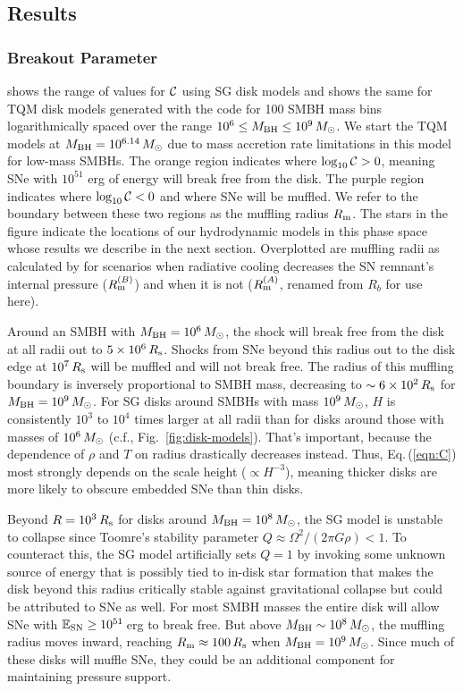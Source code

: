 
\subsection{Results} \label{sec:results-snhydro}

\subsubsection{Breakout Parameter}
 shows the range of values for $\mathcal{C}$ using SG disk models and  shows the same for TQM disk models generated with the  code for 100 SMBH mass bins logarithmically spaced over the range $10^6 \leq M_{\rm BH} \leq 10^9\,M_{\odot}$.
We start the TQM models at $M_{\rm BH}=10^{6.14}\,M_{\odot}$ due to mass accretion rate limitations in this model for low-mass SMBHs.
The orange region indicates where $\log_{10}\mathcal{C}>0$, meaning SNe with $10^{51}$ erg of energy will break free from the disk.
The purple region indicates where $\log_{10}\mathcal{C}<0$ and where SNe will be muffled.
We refer to the boundary between these two regions as the muffling radius $R_{\rm m}$.
The stars in the figure indicate the locations of our hydrodynamic models in this phase space whose results we describe in the next section.
Overplotted are muffling radii as calculated by \citet{Moranchel+21} for scenarios when radiative cooling decreases the SN remnant's internal pressure ($R_{\rm m}^{(B)}$) and when it is not ($R_{\rm m}^{(A)}$, renamed from $R_b$ for use here).

Around an SMBH with $M_{\rm BH}=10^6\,M_{\odot}$, the shock will break free from the disk at all radii out to $5\times10^6\,R_{\rm s}$.
Shocks from SNe beyond this radius out to the disk edge at $10^7\,R_{\rm s}$ will be muffled and will not break free.
The radius of this muffling boundary is inversely proportional to SMBH mass, decreasing to $\sim 6\times10^2\,R_{\rm s}$ for $M_{\rm BH}=10^9\,M_{\odot}$.
For SG disks around SMBHs with mass $10^9\,M_{\odot}$, $H$ is consistently $10^3$ to $10^4$ times larger at all radii than for disks around those with masses of $10^6\,M_{\odot}$ (c.f., Fig.~\ref{fig:disk-models}).
That's important, because the dependence of $\rho$ and $T$ on radius drastically decreases instead.
Thus, Eq.\,(\ref{eqn:C}) most strongly depends on the scale height ($\propto H^{-3}$), meaning thicker disks are more likely to obscure embedded SNe than thin disks.

Beyond $R=10^3\,R_{\rm s}$ for disks around $M_{\rm BH}=10^8\,M_{\odot}$, the SG model is unstable to collapse since Toomre's stability parameter $Q\approx\Omega^2/(2\pi G\rho) < 1$.
To counteract this, the SG model artificially sets $Q=1$ by invoking some unknown source of energy that is possibly tied to in-disk star formation that makes the disk beyond this radius critically stable against gravitational collapse but could be attributed to SNe as well.
For most SMBH masses the entire disk will allow SNe with $\mathbb{E}_{\rm SN}\geq10^{51}$\,erg to break free.
But above $M_{\rm BH} \sim 10^8\,M_{\odot}$, the muffling radius moves inward, reaching $R_{\rm m}\approx100\,R_{\rm s}$ when $M_{\rm BH}=10^9\,M_{\odot}$.
Since much of these disks will muffle SNe, they could be an additional component for maintaining pressure support.

